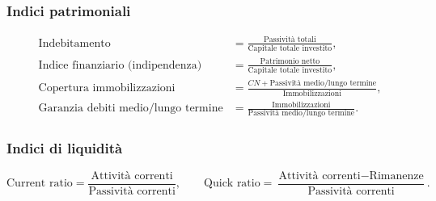 \documentclass[11pt,a4paper]{article}
\begin{document}
\subsubsection*{Indici patrimoniali}
\begin{align*}
\text{Indebitamento}&=\frac{\text{Passività totali}}{\text{Capitale totale investito}},\\
\text{Indice finanziario (indipendenza)}&=\frac{\text{Patrimonio netto}}{\text{Capitale totale investito}},\\
\text{Copertura immobilizzazioni}&=\frac{CN+\text{Passività medio/lungo termine}}{\text{Immobilizzazioni}},\\
\text{Garanzia debiti medio/lungo termine}&=\frac{\text{Immobilizzazioni}}{\text{Passività medio/lungo termine}}.
\end{align*}
\subsubsection*{Indici di liquidità}
\[\text{Current ratio}=\frac{\text{Attività correnti}}{\text{Passività correnti}},\qquad
\text{Quick ratio}=\frac{\text{Attività correnti}-\text{Rimanenze}}{\text{Passività correnti}}.\]
\end{document}

